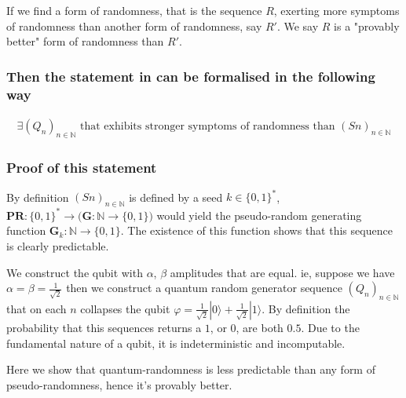 \documentclass{article}
\begin{document}
If we find a form of randomness, that is the sequence $R$, exerting more symptoms of randomness than another form of randomness, say $R'$. We say $R$ is a "provably better" form of randomness than $R'$.

\subsubsection{Then the statement in can be formalised in the following way}
\begin{align*}
	\exists (Q_n)_{n \in \mathbb{N}} \text{ that exhibits stronger symptoms of randomness than } (Sn)_{n\in\mathbb{N}}
\end{align*}

\subsubsection{Proof of this statement}
By definition $(Sn)_{n\in\mathbb{N}}$ is defined by a seed $k \in \{0,1\}^*$, $\bm{PR}: \{0,1\}^* \rightarrow \bigl(\bm{G}: \mathbb{N} \rightarrow \{0,1\}\bigr)$ would yield the pseudo-random generating function $\bm{G}_k: \mathbb{N} \rightarrow \{0,1\}$. The existence of this function shows that this sequence is clearly predictable.

We construct the qubit with $\alpha$, $\beta$ amplitudes that are equal. ie, suppose we have $\alpha = \beta = \frac{1}{\sqrt{2}}$ then we construct a quantum random generator sequence $(Q_n)_{n \in \mathbb{N}}$ that on each $n$ collapses the qubit $\varphi = \frac{1}{\sqrt{2}} | 0\rangle + \frac{1}{\sqrt{2}} | 1\rangle$. By definition the probability that this sequences returns a $1$, or $0$, are both $0.5$. Due to the fundamental nature of a qubit, it is indeterministic and incomputable.

Here we show that quantum-randomness is less predictable than any form of pseudo-randomness, hence it's provably better.
\end{document}
